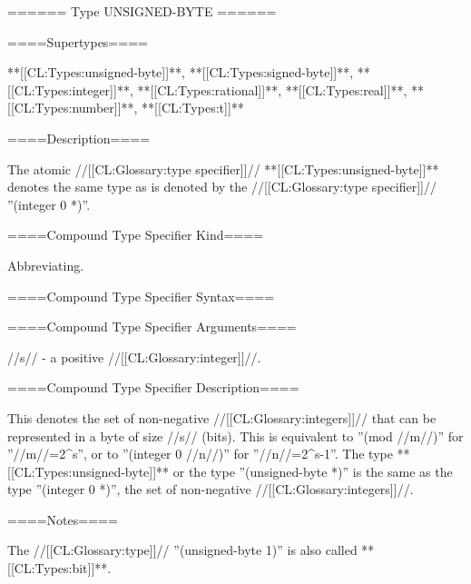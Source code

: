 ====== Type UNSIGNED-BYTE ======

====Supertypes====

**[[CL:Types:unsigned-byte]]**, **[[CL:Types:signed-byte]]**, **[[CL:Types:integer]]**, **[[CL:Types:rational]]**, **[[CL:Types:real]]**, **[[CL:Types:number]]**, **[[CL:Types:t]]**

====Description====

The atomic //[[CL:Glossary:type specifier]]// **[[CL:Types:unsigned-byte]]** denotes the same type as is denoted by the //[[CL:Glossary:type specifier]]// ''(integer 0 *)''.

====Compound Type Specifier Kind====

Abbreviating.

====Compound Type Specifier Syntax====


====Compound Type Specifier Arguments====

//s// - a positive //[[CL:Glossary:integer]]//.

====Compound Type Specifier Description====

This denotes the set of non-negative //[[CL:Glossary:integers]]// that can be represented in a byte of size //s// (bits). This is equivalent to ''(mod //m//)'' for ''//m//=2^s'', or to ''(integer 0 //n//)'' for ''//n//=2^s-1''. The type **[[CL:Types:unsigned-byte]]** or the type ''(unsigned-byte *)'' is the same as the type ''(integer 0 *)'', the set of non-negative //[[CL:Glossary:integers]]//.

====Notes====

The //[[CL:Glossary:type]]// ''(unsigned-byte 1)'' is also called **[[CL:Types:bit]]**.

